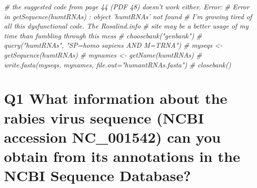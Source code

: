 \documentclass[]{article}
\newenvironment{Shaded}{\begin{snugshade}}{\end{snugshade}}
\newcommand{\KeywordTok}[1]{\textcolor[rgb]{0.13,0.29,0.53}{\textbf{#1}}}
\newcommand{\DecValTok}[1]{\textcolor[rgb]{0.00,0.00,0.81}{#1}}
\newcommand{\StringTok}[1]{\textcolor[rgb]{0.31,0.60,0.02}{#1}}
\newcommand{\CommentTok}[1]{\textcolor[rgb]{0.56,0.35,0.01}{\textit{#1}}}
\newcommand{\OperatorTok}[1]{\textcolor[rgb]{0.81,0.36,0.00}{\textbf{#1}}}
\newcommand{\NormalTok}[1]{#1}
\begin{document}
\begin{Shaded}
\begin{Highlighting}[]
\CommentTok{# the suggested code from page 44 (PDF 48) doesn't work either. Error:}
\CommentTok{# Error in getSequence(humtRNAs) : object 'humtRNAs' not found}
\CommentTok{# I'm growing tired of all this dysfunctional code. The Rosalind.info}
\CommentTok{# site may be a better usage of my time than fumbling through this mess}
\CommentTok{# choosebank("genbank")}
\CommentTok{# query("humtRNAs", "SP=homo sapiens AND M=TRNA")}
\CommentTok{# myseqs <- getSequence(humtRNAs)}
\CommentTok{# mynames <- getName(humtRNAs)}
\CommentTok{# write.fasta(myseqs, mynames, file.out="humantRNAs.fasta")}
\CommentTok{# closebank()}
\end{Highlighting}
\end{Shaded}

\section{Q1 What information about the rabies virus sequence (NCBI
accession NC\_001542) can you obtain from its annotations in the NCBI
Sequence
Database?}\label{q1-what-information-about-the-rabies-virus-sequence-ncbi-accession-nc_001542-can-you-obtain-from-its-annotations-in-the-ncbi-sequence-database}

\begin{Shaded}
\end{Shaded}
\end{document}
